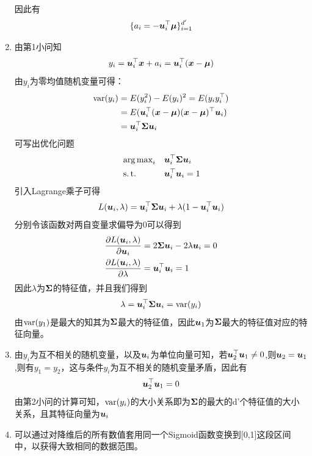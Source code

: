 \documentclass[answers]{exam}  %
\begin{document}
\begin{questions}
\begin{solution}
\begin{enumerate}
\[\begin{aligned}
                \end{aligned}
            \]
            因此有
            \[\{a_{i}=-\boldsymbol{u}_{i}^{\top} \boldsymbol{\mu}\}_{i=1}^{d'}\]
            \item 
            由第1小问知
            \[y_i=\boldsymbol{u}_i^\top{\boldsymbol{x}}+a_i=\boldsymbol{u}_i^\top({\boldsymbol{x}}-\boldsymbol{\mu})\]
            由$y_i$为零均值随机变量可得：
            \[
                \begin{aligned}
                    \operatornamewithlimits{var}(y_i)&=E(y_i^2)-E(y_i)^2=E(y_iy_i^\top)\\
                    &=E(\vu_i^\top(\vx-\vmu)(\vx-\vmu)^\top\vu_i)\\
                    &=\vu^\top_i\mSigma\vu_i
                \end{aligned}    
            \]
            可写出优化问题
            \[
                \begin{aligned}
                    &\argmax\limits_{i}&&\vu_i^\top\mSigma\vu_i\\
                    &\operatornamewithlimits{s.t.}&&\vu_i^\top\vu_i=1
                \end{aligned}  
            \]
            引入Lagrange乘子可得
            \[L(\boldsymbol{u}_i,\lambda)=\boldsymbol{u}_i^\top\boldsymbol{\Sigma}\boldsymbol{u}_i+\lambda(1-\boldsymbol{u}_i^\top\boldsymbol{u}_i)\]
            分别令该函数对两自变量求偏导为0可以得到
            \[
                \begin{aligned}
                    &\frac{\partial L(\boldsymbol{u}_i,\lambda)}{\partial \boldsymbol{u}_i}=2\boldsymbol{\Sigma}\boldsymbol{u}_i -2\lambda\boldsymbol{u}_i = 0\\
                    &\frac{\partial L(\boldsymbol{u}_i,\lambda)}{\partial \lambda} = \boldsymbol{u}_i^\top\boldsymbol{u}_i=1
                \end{aligned}  
            \]
            因此$\lambda$为$\boldsymbol{\Sigma}$的特征值，并且我们得到
            \[\lambda = \vu^\top_i\mSigma\vu_i=\operatornamewithlimits{var}(y_i)\]
            由$\operatornamewithlimits{var}(y_1)$是最大的知其为$\boldsymbol{\Sigma}$最大的特征值，因此$\boldsymbol{u}_1$为$\boldsymbol{\Sigma}$最大的特征值对应的特征向量。
            \item 由$y_i$为互不相关的随机变量，以及$\boldsymbol{u}_i$为单位向量可知，若$\boldsymbol{u}_2^\top\boldsymbol{u}_1\not=0$,则$\boldsymbol{u}_2=\boldsymbol{u}_1$,则有$y_1=y_2$，这与条件$y_i$为互不相关的随机变量矛盾，因此有
            \[\boldsymbol{u}_2^\top\boldsymbol{u}_1=0\]
            由第2小问的计算可知，$\operatornamewithlimits{var}(y_i)$的大小关系即为$\boldsymbol{\Sigma}$的最大的d'个特征值的大小关系，且其特征向量为$\boldsymbol{u}_i$
            \item 可以通过对降维后的所有数值套用同一个Sigmoid函数变换到[0,1]这段区间中，以获得大致相同的数据范围。
        \end{enumerate}
	\end{solution}
\end{questions}
\end{document}
